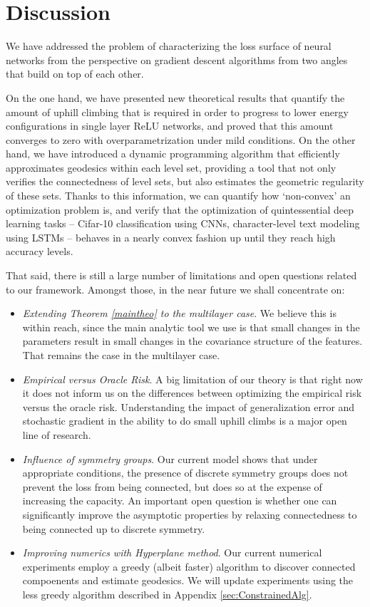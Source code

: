 \section{Discussion}
\label{sec:Discussion}

We have addressed the problem of characterizing the loss surface of neural networks from the perspective
on gradient descent algorithms from two angles that build on top of each other. 

On the one hand, we have presented new theoretical results that quantify 
the amount of uphill climbing that is required in order to progress to lower energy configurations in 
single layer ReLU networks, and proved that this amount converges to zero with overparametrization under mild conditions. On the other hand, we have introduced a dynamic programming algorithm that efficiently approximates geodesics within each level set, providing a tool that not only verifies the connectedness of level sets, but also estimates the geometric regularity of these sets. Thanks to this information, we can quantify how `non-convex' an optimization problem is, and verify that the optimization of quintessential deep learning tasks -- Cifar-10 classification using CNNs, character-level text modeling using LSTMs -- behaves in a nearly convex fashion up until they reach high accuracy levels.

That said, there is still a large number of limitations and open questions related to our framework. Amongst those, in the near future we shall concentrate on:
\begin{itemize}
\item \emph{Extending Theorem \ref{maintheo} to the multilayer case}. We believe this is within reach, since the main analytic tool we use is that small changes in the parameters result in small changes in the covariance structure of the features. That remains the case in the multilayer case. 
\item \emph{Empirical versus Oracle Risk}. A big limitation of our theory is that right now it does not inform us on the differences between optimizing the empirical risk versus the oracle risk. Understanding the impact of generalization error and stochastic gradient in the ability to do small uphill climbs is a major open line of research.
\item \emph{Influence of symmetry groups}. Our current model shows that under appropriate conditions, the presence of discrete symmetry groups does not prevent the loss from being connected, but does so at the expense of increasing the capacity. An important open question is whether one can significantly improve the asymptotic properties by relaxing connectedness to being connected up to discrete symmetry. 
\item \emph{Improving numerics with Hyperplane method}. Our current numerical experiments employ a greedy (albeit faster) algorithm to discover connected compoenents and estimate geodesics. We will update experiments using the less greedy algorithm described in Appendix \ref{sec:ConstrainedAlg}. 
\end{itemize}
 

%

